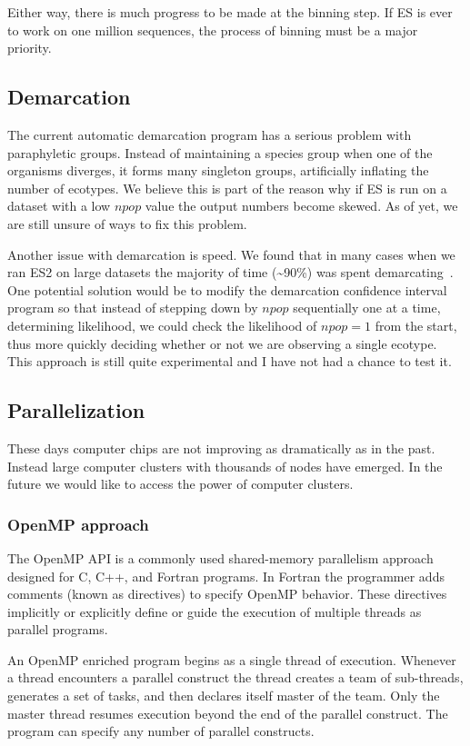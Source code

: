 Either way, there is much progress to be made at the binning step.
If ES is ever to work on one million sequences, the process of binning must be a major priority.

\subsection*{Demarcation}
The current automatic demarcation program has a serious problem with paraphyletic groups.
Instead of maintaining a species group when one of the organisms diverges, it forms many singleton groups, artificially inflating the number of ecotypes.
We believe this is part of the reason why if ES is run on a dataset with a low $npop$ value the output numbers become skewed.
As of yet, we are still unsure of ways to fix this problem.

Another issue with demarcation is speed.
We found that in many cases when we ran ES2 on large datasets the majority of time (\textasciitilde90\%) was spent demarcating~\cite{lingThesis}.
One potential solution would be to modify the demarcation confidence interval program so that instead of stepping down by $npop$ sequentially one at a time, determining likelihood, we could check the likelihood of $npop = 1$ from the start, thus more quickly deciding whether or not we are observing a single ecotype.
This approach is still quite experimental and I have not had a chance to test it.

\subsection*{Parallelization}
These days computer chips are not improving as dramatically as in the past.
Instead large computer clusters with thousands of nodes have emerged.
In the future we would like to access the power of computer clusters.

\subsubsection*{OpenMP approach}
The OpenMP API is a commonly used shared-memory parallelism approach designed for C, C++, and Fortran programs.
In Fortran the programmer adds comments (known as directives) to specify OpenMP behavior.
These directives implicitly or explicitly define or guide the execution of multiple threads as parallel programs.

An OpenMP enriched program begins as a single thread of execution.
Whenever a thread encounters a parallel construct the thread creates a team of sub-threads, generates a set of tasks, and then declares itself master of the team.
Only the master thread resumes execution beyond the end of the parallel construct.
The program can specify any number of parallel constructs.

